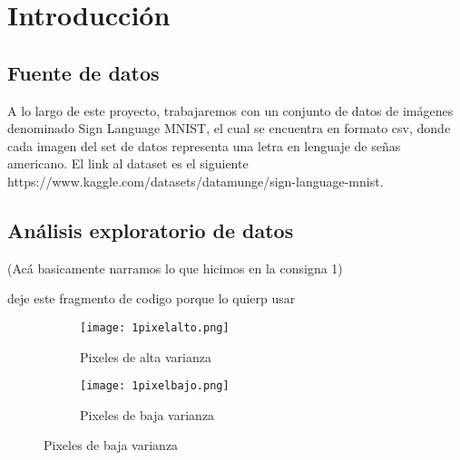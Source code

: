 \documentclass[10pt,a4paper]{article}
\begin{document}
\maketitle

\section{Introducción}

\subsection{Fuente de datos}

A lo largo de este proyecto, trabajaremos con un conjunto de datos de imágenes denominado Sign
Language MNIST, el cual se encuentra en formato csv, donde cada imagen del set de datos representa una letra en lenguaje de
señas americano. El link al dataset es el siguiente https://www.kaggle.com/datasets/datamunge/sign-language-mnist.

\subsection{Análisis exploratorio de datos}

(Acá basicamente narramos lo que hicimos en la consigna 1)

deje este fragmento de codigo porque lo quierp usar
\begin{figure}[ht!]
	\begin{subfigure}{0.5\textwidth}
		\texttt{[image: 1pixelalto.png]} 
		\caption{Pixeles de alta varianza}
		\label{fig:subfig1}
	\end{subfigure}
	\begin{subfigure}{0.5\textwidth}
		\texttt{[image: 1pixelbajo.png]}
		\caption{Pixeles de baja varianza}
		\label{fig:subfig2}
	\end{subfigure}
	\label{fig:subfigs}
\end{figure}
\end{document}
